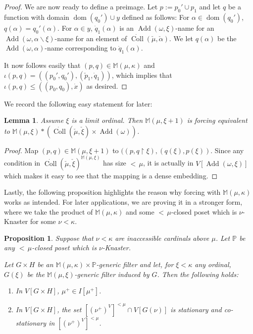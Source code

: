 \documentclass[a4paper]{amsart}
\theoremstyle{definition}
\theoremstyle{remark}
\theoremstyle{plain}
\newtheorem{mylem}[mydef]{Lemma}
\newtheorem{mypro}[mydef]{Proposition}
\numberwithin{mydef}{section}
\DeclareMathOperator{\dom}{dom}
\DeclareMathOperator{\Add}{Add}
\DeclareMathOperator{\Coll}{Coll}
\newcommand{\dM}{\mathbb{M}}
\newcommand{\dP}{\mathbb{P}}
\newcommand{\uhr}{\upharpoonright}
\begin{document}
\begin{proof}
		We are now ready to define a preimage. Let $p:=p_0'\cup p_1$ and let $q$ be a function with domain $\dom(q_0')\cup y$ defined as follows: For $\alpha\in\dom(q_0')$, $q(\alpha)=q_0'(\alpha)$. For $\alpha\in y$, $\dot{q}_1(\alpha)$ is an $\Add(\omega,\xi)$-name for an $\Add(\omega,\alpha\smallsetminus\xi)$-name for an element of $\dot{\Coll}(\check{\mu},\check{\alpha})$. We let $q(\alpha)$ be the $\Add(\omega,\alpha)$-name corresponding to $\dot{q}_1(\alpha)$.
		
		It now follows easily that $(p,q)\in\dM(\mu,\kappa)$ and $\iota(p,q)=((p_0',q_0'),(\check{p}_1,\dot{q}_1))$, which implies that $\iota(p,q)\leq((p_0,q_0),\dot{x})$ as desired.
	\end{proof}
	
	We record the following easy statement for later:
	
	\begin{mylem}\label{PartialEval}
		Assume $\xi$ is a limit ordinal. Then $\dM(\mu,\xi+1)$ is forcing equivalent to $\dM(\mu,\xi)*(\dot{\Coll}(\check{\mu},\check{\xi})\times\Add(\omega))$.
	\end{mylem}
	
	\begin{proof}
		Map $(p,q)\in\dM(\mu,\xi+1)$ to $((p,q\uhr\xi),(q(\xi),p(\xi))$. Since any condition in $\dot{\Coll}(\check{\mu},\check{\xi})^{\dM(\mu,\xi)}$ has size ${<}\,\mu$, it is actually in $V[\Add(\omega,\xi)]$ which makes it easy to see that the mapping is a dense embedding.
	\end{proof}
	
	Lastly, the following proposition highlights the reason why forcing with $\dM(\mu,\kappa)$ works as intended. For later applications, we are proving it in a stronger form, where we take the product of $\dM(\mu,\kappa)$ and some ${<}\,\mu$-closed poset which is $\nu$-Knaster for some $\nu<\kappa$.
	
	\begin{mypro}\label{MainProp}
		Suppose that $\nu<\kappa$ are inaccessible cardinals above $\mu$. Let $\dP$ be any ${<}\,\mu$-closed poset which is $\nu$-Knaster.
		
		Let $G\times H$ be an $\dM(\mu,\kappa)\times\dP$-generic filter and let, for $\xi<\kappa$ any ordinal, $G(\xi)$ be the $\dM(\mu,\xi)$-generic filter induced by $G$. Then the following holds:
		
		\begin{enumerate}
			\item In $V[G\times H]$, $\mu^+\in I[\mu^+]$.
			\item In $V[G\times H]$, the set $[(\nu^+)^V]^{<\mu}\cap V[G(\nu)]$ is stationary and co-stationary in $[(\nu^+)^V]^{<\mu}$.
		\end{enumerate}
	\end{mypro}
	
\end{document}
